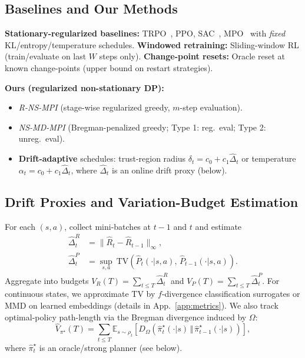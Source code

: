 \documentclass{article}
\theoremstyle{plain}
\theoremstyle{definition}
\theoremstyle{remark}
\newcommand{\E}{\mathbb{E}}
\newcommand{\1}{\mathbbm{1}}
\begin{document}
\subsection{Baselines and Our Methods}
\label{subsec:baselines}
\textbf{Stationary-regularized baselines:} TRPO~\citep{schulman2015trpo}, PPO, SAC~\citep{haarnoja2018sac}, MPO~\citep{abdolmaleki2018mpo} with \emph{fixed} KL/entropy/temperature schedules.
\textbf{Windowed retraining:} Sliding-window RL (train/evaluate on last $W$ steps only).
\textbf{Change-point resets:} Oracle reset at known change-points (upper bound on restart strategies).

\textbf{Ours (regularized non-stationary DP):}
\begin{itemize}[leftmargin=*,nosep]
\item \emph{R-NS-MPI} (stage-wise regularized greedy, $m$-step evaluation).
\item \emph{NS-MD-MPI} (Bregman-penalized greedy; Type 1: reg.\ eval; Type 2: unreg.\ eval).
\item \textbf{Drift-adaptive} schedules: trust-region radius $\delta_t=c_0+c_1\widehat{\Delta}_t$ or temperature $\alpha_t=c_0+c_1\widehat{\Delta}_t$, where $\widehat{\Delta}_t$ is an online drift proxy (below).
\end{itemize}

\subsection{Drift Proxies and Variation-Budget Estimation}
\label{subsec:drift}
For each $(s,a)$, collect mini-batches at $t-1$ and $t$ and estimate
\begin{align}
\widehat{\Delta}^R_t&=\| \widehat R_t-\widehat R_{t-1}\|_\infty, \qquad\\
\widehat{\Delta}^P_t &= \sup_{s,a}\ \mathrm{TV}\!\left(\widehat P_t(\cdot|s,a),\,\widehat P_{t-1}(\cdot|s,a)\right).
\end{align}
Aggregate into budgets $V_R(T)=\sum_{t\le T}\widehat{\Delta}^R_t$ and $V_P(T)=\sum_{t\le T}\widehat{\Delta}^P_t$. For continuous states, we approximate TV by $f$-divergence classification surrogates or MMD on learned embeddings (details in App.~\ref{app:metrics}). We also track optimal-policy path-length via the Bregman divergence induced by $\Omega$:
\[
\widehat V_{\pi^\star}(T)=\sum_{t\le T}\E_{s\sim \rho_t}\!\left[D_\Omega\!\left(\hat\pi^\star_t(\cdot|s)\,\Vert\,\hat\pi^\star_{t-1}(\cdot|s)\right)\right],
\]
where $\hat\pi^\star_t$ is an oracle/strong planner (see below).
\end{document}
